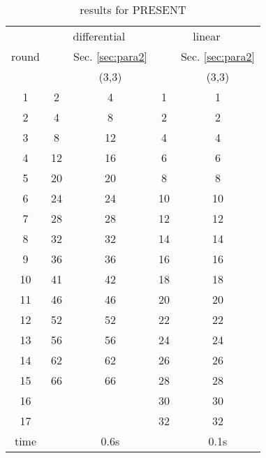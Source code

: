 \begin{table}
	\caption{results for PRESENT}\label{tab:present}
	\centering
	\begin{tabular}{|c|c|c|c|c|}
		\hline
		\multirow{3}{*}{round}&\multicolumn{2}{|c|}{differential}&\multicolumn{2}{|c|}{linear}\\
        \cline{2-5}
		&\multirow{2}{*}{\cite{ZZDX19}}&Sec. \ref{sec:para2}&\multirow{2}{*}{\cite{ZZDX19}}&Sec. \ref{sec:para2}\\
		\cline{3-3}\cline{5-5}
		&&(3,3)&&(3,3)\\
        \hline
		1&	2&	4&	 	1&	1	\\
		2&	4&	8&		2&	2	\\
		3&	8&	12&	 	4&	4	\\
		4&	12&	16&	 	6&	6	\\
		5&	20&	20&	 	8&	8	\\
		6&	24&	24&	 	10&	10	\\
		7&	28&	28&		12&	12	\\
		8&	32&	32&		14&	14	\\
		9&	36&	36&		16&	16	\\
		10&	41&	42&		18&	18	\\
		11&	46&	46& 	20&	20	\\
		12&	52&	52&	 	22&	22	\\
		13&	56&	56&		24&	24	\\
		14&	62&	62&		26&	26	\\
		15&	66&	66&		28&	28	\\
		16&	&	&		30&	30	\\
		17&	&	&		32&	32	\\
		\hline
		time&&0.6s&&0.1s\\
		\hline
	\end{tabular}
\end{table}

